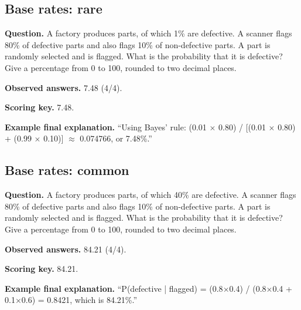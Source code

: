 \noindent\begin{minipage}{\linewidth}
\subsection{Base rates: rare}
\noindent\textbf{Question.} A factory produces parts, of which 1\% are defective. A scanner flags 80\% of defective parts and also flags 10\% of non-defective parts. A part is randomly selected and is flagged. What is the probability that it is defective? Give a percentage from 0 to 100, rounded to two decimal places.\par
\noindent\textbf{Observed answers.} 7.48 (4/4).\par
\noindent\textbf{Scoring key.} 7.48.\par
\noindent\textbf{Example final explanation.} ``Using Bayes' rule: (0.01 $\times$ 0.80) / [(0.01 $\times$ 0.80) + (0.99 $\times$ 0.10)] $\approx$ 0.074766, or 7.48\%.''\par
\end{minipage}\par\medskip

\noindent\begin{minipage}{\linewidth}
\subsection{Base rates: common}
\noindent\textbf{Question.} A factory produces parts, of which 40\% are defective. A scanner flags 80\% of defective parts and also flags 10\% of non-defective parts. A part is randomly selected and is flagged. What is the probability that it is defective? Give a percentage from 0 to 100, rounded to two decimal places.\par
\noindent\textbf{Observed answers.} 84.21 (4/4).\par
\noindent\textbf{Scoring key.} 84.21.\par
\noindent\textbf{Example final explanation.} ``P(defective | flagged) = (0.8$\times$0.4) / (0.8$\times$0.4 + 0.1$\times$0.6) = 0.8421, which is 84.21\%.''\par
\end{minipage}\par\medskip

